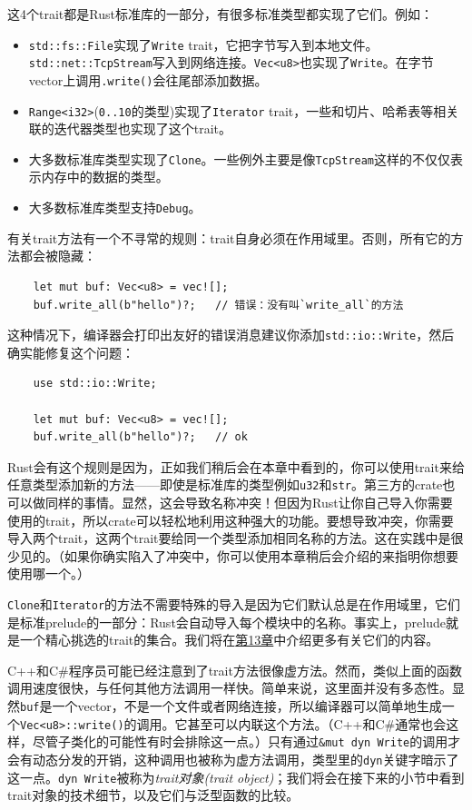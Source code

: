 这4个trait都是Rust标准库的一部分，有很多标准类型都实现了它们。例如：
\begin{itemize}
    \item \texttt{std::fs::File}实现了\texttt{Write} trait，它把字节写入到本地文件。\texttt{std::net::TcpStream}写入到网络连接。\texttt{Vec<u8>}也实现了\texttt{Write}。在字节vector上调用\texttt{.write()}会往尾部添加数据。
    \item \texttt{Range<i32>}(\texttt{0..10}的类型)实现了\texttt{Iterator} trait，一些和切片、哈希表等相关联的迭代器类型也实现了这个trait。
    \item 大多数标准库类型实现了\texttt{Clone}。一些例外主要是像\texttt{TcpStream}这样的不仅仅表示内存中的数据的类型。
    \item 大多数标准库类型支持\texttt{Debug}。
\end{itemize}

有关trait方法有一个不寻常的规则：trait自身必须在作用域里。否则，所有它的方法都会被隐藏：
\begin{verbatim}
    let mut buf: Vec<u8> = vec![];
    buf.write_all(b"hello")?;   // 错误：没有叫`write_all`的方法
\end{verbatim}

这种情况下，编译器会打印出友好的错误消息建议你添加\texttt{std::io::Write}，然后确实能修复这个问题：
\begin{verbatim}
    use std::io::Write;

    let mut buf: Vec<u8> = vec![];
    buf.write_all(b"hello")?;   // ok
\end{verbatim}

Rust会有这个规则是因为，正如我们稍后会在本章中看到的，你可以使用trait来给任意类型添加新的方法——即使是标准库的类型例如\texttt{u32}和\texttt{str}。第三方的crate也可以做同样的事情。显然，这会导致名称冲突！但因为Rust让你自己导入你需要使用的trait，所以crate可以轻松地利用这种强大的功能。要想导致冲突，你需要导入两个trait，这两个trait要给同一个类型添加相同名称的方法。这在实践中是很少见的。（如果你确实陷入了冲突中，你可以使用本章稍后会介绍的来指明你想要使用哪一个。）

\texttt{Clone}和\texttt{Iterator}的方法不需要特殊的导入是因为它们默认总是在作用域里，它们是标准prelude的一部分：Rust会自动导入每个模块中的名称。事实上，prelude就是一个精心挑选的trait的集合。我们将在\hyperref[ch13]{第13章}中介绍更多有关它们的内容。

C++和C\#程序员可能已经注意到了trait方法很像虚方法。然而，类似上面的函数调用速度很快，与任何其他方法调用一样快。简单来说，这里面并没有多态性。显然\texttt{buf}是一个vector，不是一个文件或者网络连接，所以编译器可以简单地生成一个\texttt{Vec<u8>::write()}的调用。它甚至可以内联这个方法。（C++和C\#通常也会这样，尽管子类化的可能性有时会排除这一点。）只有通过\texttt{\&mut dyn Write}的调用才会有动态分发的开销，这种调用也被称为虚方法调用，类型里的\texttt{dyn}关键字暗示了这一点。\texttt{dyn Write}被称为\emph{trait对象(trait object)}；我们将会在接下来的小节中看到trait对象的技术细节，以及它们与泛型函数的比较。

